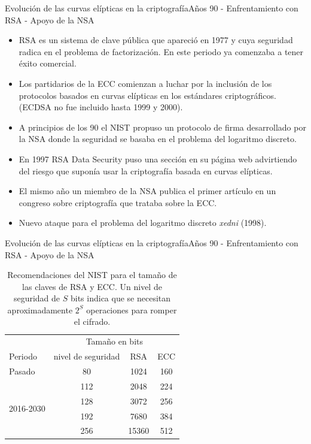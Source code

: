 \documentclass[spanish]{beamer}
\begin{document}
\begin{frame}[fragile]{Evolución de las curvas elípticas en la criptografía}{Años 90 - Enfrentamiento con RSA - Apoyo de la NSA}
  \begin{itemize}
    \item RSA es un sistema de clave pública que apareció en 1977 y cuya seguridad radica en el problema de factorización. En este periodo ya comenzaba a tener éxito comercial. %
    \item Los partidarios de la ECC comienzan a luchar por la inclusión de los protocolos basados en curvas elípticas en los estándares criptográficos. (ECDSA no fue incluido hasta 1999 y 2000).
    \item A principios de los 90 el NIST propuso un protocolo de firma desarrollado por la NSA donde la seguridad se basaba en el problema del logaritmo discreto.%
    \item En 1997 RSA Data Security puso una sección en su página web advirtiendo del riesgo que suponía usar la criptografía basada en curvas elípticas. %
    \item El mismo año  un miembro de la NSA publica
    el primer artículo en un congreso sobre criptografía que trataba sobre la ECC.
    \item Nuevo ataque para el problema del logaritmo discreto \textit{xedni} (1998). %
  \end{itemize}
\end{frame}

\begin{frame}[fragile]{Evolución de las curvas elípticas en la criptografía}{Años 90 - Enfrentamiento con RSA - Apoyo de la NSA}
\begin{table}[h]
  \centering
  \sffamily
  \begin{tabular}{lccc}
    \toprule
     & \multicolumn{3}{c}{Tamaño en bits} \\
    Periodo & nivel de seguridad & RSA & ECC \\
    \midrule
    Pasado & 80 & 1024 & 160\\
    \multirow[t]{4}{*}{2016-2030} & 112 & 2048 & 224\\
     & 128 & 3072 & 256\\
     & 192 & 7680 & 384\\
     & 256 & 15360 & 512\\
    \bottomrule
  \end{tabular}
  \caption{Recomendaciones del NIST para el tamaño de las claves de RSA y ECC. Un nivel de seguridad de \(S\) bits indica que se necesitan aproximadamente \(2^S\) operaciones para romper el cifrado.}
  \label{tab:rsa-ecc-nist}
\end{table} %
\end{frame}


\begin{frame}
  \printbibliography
\end{frame}
\end{document}

